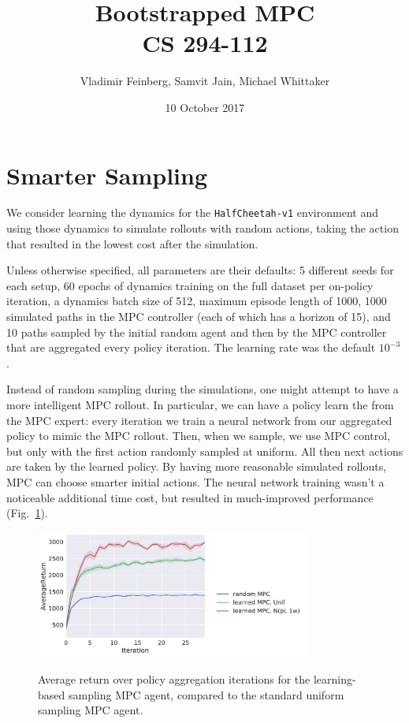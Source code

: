 \documentclass{article}
\title{Bootstrapped MPC\\\large CS 294-112}
\author{Vladimir Feinberg, Samvit Jain, Michael Whittaker}
\date{10 October 2017}
\begin{document}
	
\maketitle

\section{Smarter Sampling}\label{smart-sample}

We consider learning the dynamics for the \texttt{HalfCheetah-v1} environment and using those dynamics to simulate rollouts with random actions, taking the action that resulted in the lowest cost after the simulation.

Unless otherwise specified, all parameters are their defaults: 5 different seeds for each setup, 60 epochs of dynamics training on the full dataset per on-policy iteration, a dynamics batch size of 512, maximum episode length of 1000, 1000 simulated paths in the MPC controller (each of which has a horizon of 15), and 10 paths sampled by the initial random agent and then by the MPC controller that are aggregated every policy iteration. The learning rate was the default $10^{-3}$.

Instead of random sampling during the simulations, one might attempt to have a more intelligent MPC rollout. In particular, we can have a policy learn the from the MPC expert: every iteration we train a neural network from our aggregated policy to mimic the MPC rollout. Then, when we sample, we use MPC control, but only with the first action randomly sampled at uniform. All then next actions are taken by the learned policy. By having more reasonable simulated rollouts, MPC can choose smarter initial actions. The neural network training wasn't a noticeable additional time cost, but resulted in much-improved performance (Fig.~\ref{fig:mpcmf}).

\begin{figure}[!h]
  \begin{center}
    {\includegraphics[width=0.8\textwidth]{long-AverageReturn.pdf}}
  \end{center}
  \caption{Average return over policy aggregation iterations for the learning-based sampling MPC agent, compared to the standard uniform sampling MPC agent.}
\label{fig:mpcmf}
\end{figure}
\end{document}
